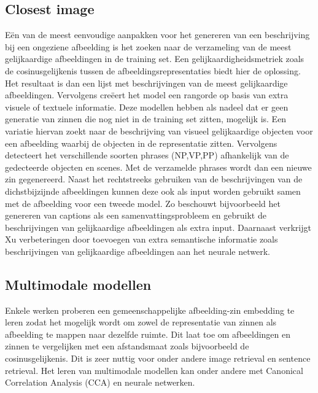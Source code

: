 \subsection{Closest image}
E\"en van de meest eenvoudige aanpakken voor het genereren van een beschrijving bij een ongeziene afbeelding is het zoeken naar de verzameling van de meest gelijkaardige afbeeldingen in de training set. Een gelijkaardigheidsmetriek zoals de cosinusgelijkenis tussen de afbeeldingsrepresentaties biedt hier de oplossing. Het resultaat is dan een lijst met beschrijvingen van de meest gelijkaardige afbeeldingen. Vervolgens cre\"eert het model een rangorde op basis van extra visuele of textuele informatie.\cite{Ordonez}\cite{Oliva}\cite{Torralba}\cite{Devlin}
Deze modellen hebben als nadeel dat er geen generatie van zinnen die nog niet in de training set zitten, mogelijk is.
Een variatie hiervan \cite{Kuznetsova}\cite{Gupta} zoekt naar de beschrijving van visueel gelijkaardige objecten voor een afbeelding waarbij de objecten in de representatie zitten. Vervolgens detecteert het verschillende soorten phrases (NP,VP,PP) afhankelijk van de gedecteerde objecten en scenes. Met de verzamelde phrases wordt dan een nieuwe zin gegenereerd.
Naast het rechtstreeks gebruiken van de beschrijvingen van de dichstbijzijnde afbeeldingen kunnen deze ook als input worden gebruikt samen met de afbeelding voor een tweede model. \cite{Mason} Zo beschouwt \cite{Mason} bijvoorbeeld het genereren van captions als een samenvattingsprobleem en gebruikt de beschrijvingen van gelijkaardige afbeeldingen als extra input. Daarnaast verkrijgt Xu\cite{Xu} verbeteringen door toevoegen van extra semantische informatie zoals beschrijvingen van gelijkaardige afbeeldingen aan het neurale netwerk.
 
\subsection{Multimodale modellen}
Enkele werken proberen een gemeenschappelijke afbeelding-zin embedding te leren zodat het mogelijk wordt om zowel de representatie van zinnen als afbeelding te mappen naar dezelfde ruimte. Dit laat toe om afbeeldingen en zinnen te vergelijken met een afstandsmaat zoals bijvoorbeeld de cosinusgelijkenis. Dit is zeer nuttig voor onder andere image retrieval en sentence retrieval. Het leren van multimodale modellen kan onder andere met Canonical Correlation Analysis (CCA)\cite{Hodosh} en neurale netwerken. \cite{Mao}\cite{Karpathy 1}\cite{Fang}

